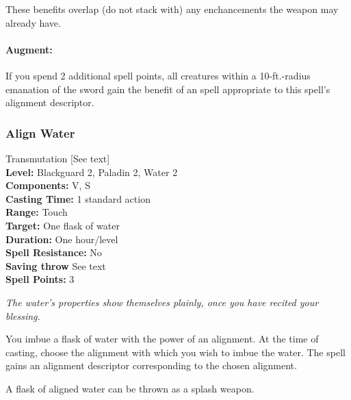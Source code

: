 These benefits overlap (do not stack with) any enchancements the weapon may already have.

\paragraph{Augment:} If you spend 2 additional spell points, all creatures within a 10-ft.-radius emanation of the sword
gain the benefit of an  spell appropriate to this spell's alignment descriptor.
\subsubsection{Align Water}
\label{Spell:AlignWater}
Transmutation [See text]
\\ \textbf{Level:} Blackguard 2, Paladin 2, Water 2
\\ \textbf{Components:} V, S
\\ \textbf{Casting Time:} 1 standard action
\\ \textbf{Range:} Touch
\\ \textbf{Target:} One flask of water
\\ \textbf{Duration:} One hour/level
\\ \textbf{Spell Resistance:} No
\\ \textbf{Saving throw} See text
\\ \textbf{Spell Points:} 3

\emph{The water's properties show themselves plainly, once you have recited your blessing.}

You imbue a flask of water with the power of an alignment.
At the time of casting, choose the alignment with which you wish to imbue the water.
The spell gains an alignment descriptor corresponding to the chosen alignment.

A flask of aligned water can be thrown as a splash weapon.

